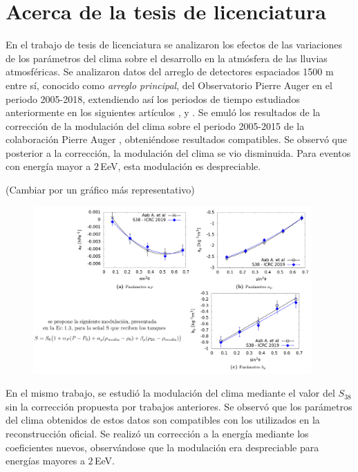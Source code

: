 \section{Acerca de la tesis de licenciatura}

En el trabajo de tesis de licenciatura se analizaron los efectos de las variaciones de los parámetros del clima sobre el desarrollo en la atmósfera de las lluvias atmosféricas. Se analizaron datos del arreglo de detectores espaciados 1500 m entre sí, conocido como \emph{arreglo principal}, del Observatorio Pierre Auger en el periodo 2005-2018,  extendiendo  así los periodos de tiempo estudiados anteriormente en los siguientes artículos \cite{abraham2009atmospheric}, \cite{abreu2012description}   y\cite{aab2017impact} . Se emuló los resultados de la corrección de la modulación del clima sobre el periodo 2005-2015 de la colaboración Pierre Auger \cite{aab2017impact}, obteniéndose resultados compatibles. Se observó que posterior a la corrección, la modulación del clima se vio disminuida. Para eventos con energía mayor a $2\,$EeV, esta modulación es despreciable.

(Cambiar por un gráfico más representativo)
  \begin{figure}[H]
    \centering
    \includegraphics[width=0.95\textwidth]{../beamer-07-05-2020/tesis.png}
  \end{figure}

En el mismo trabajo, se estudió la modulación del clima mediante el valor del $S_{38}$ sin la corrección propuesta por trabajos anteriores. Se observó que los parámetros del clima obtenidos de estos datos son compatibles con los utilizados en la reconstrucción oficial. Se realizó un corrección a  la energía mediante los coeficientes nuevos, observándose que la modulación era despreciable para energías mayores a $2\,$EeV. 

